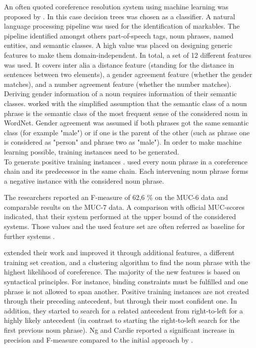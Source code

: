 An often quoted coreference resolution system using machine learning was proposed by \cite{soon2001machine}. In this case decision trees was chosen as a classifier. A natural language processing pipeline was used for the identification of markables. The pipeline identified amongst others part-of-speech tags, noun phrases, named entities, and semantic classes. A high value was placed on designing generic features to make them domain-independent. In total, a set of 12 different features was used. It covers inter alia a distance feature (standing for the distance in sentences between two elements), a gender agreement feature (whether the gender matches), and a number agreement feature (whether the number matches). Deriving gender information of a noun requires information of their semantic classes. \cite{soon2001machine} worked with the simplified assumption that the semantic class of a noun phrase is the semantic class of the most frequent sense of the considered noun in WordNet. Gender agreement was assumed if both phrases got the same semantic class (for example "male") or if one is the parent of the other (such as phrase one is considered as "person" and phrase two as "male"). 
In order to make machine learning possible, training instances need to be generated.\\
To generate positive training instances \cite{soon2001machine}. used every noun phrase in a coreference chain and its predecessor in the same chain. Each intervening noun phrase forms a negative instance with the considered noun phrase. 

The researchers reported an F-measure of 62,6 \% on the MUC-6 data and comparable results on the MUC-7 data. A comparison with official MUC-scores indicated, that their system performed at the upper bound of the considered systems. Those values and the used feature set are often referred as baseline for further systems \citep{versley2008bart}.

\citep{ng2002improving} extended their work and improved it through additional features, a different training set creation, and a clustering algorithm to find the noun phrase with the highest likelihood of coreference. The majority of the new features is based on syntactical principles. For instance, binding constraints must be fulfilled and one phrase is not allowed to span another. Positive training instances are not created through their preceding antecedent, but through their most confident one. In addition, they started to search for a related antecedent from right-to-left for a highly likely antecedent (in contrast to starting the right-to-left search for the first previous noun phrase). Ng and Cardie reported a significant increase in precision and F-measure compared to the initial approach by \citep{soon2001machine}.

